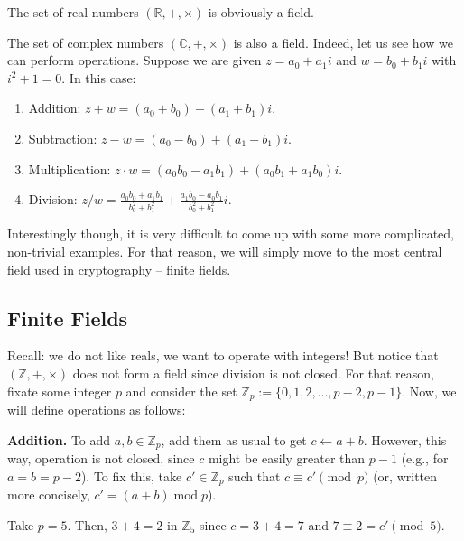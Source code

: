 \documentclass[../lecture-notes-148x210.tex]{subfiles}
\begin{document}
\begin{example}
    The set of real numbers $(\mathbb{R}, +, \times)$ is obviously a field.
\end{example}

\begin{example}
    The set of complex numbers $(\mathbb{C}, +, \times)$ is also a field. Indeed, let us see how we can perform operations. Suppose we are given $z = a_0 + a_1i$ and $w = b_0 + b_1i$ with $i^2+1=0$. In this case:
    \begin{enumerate}
        \item Addition: $z + w = (a_0 + b_0) + (a_1 + b_1)i$.
        \item Subtraction: $z - w = (a_0 - b_0) + (a_1 - b_1)i$.
        \item Multiplication: $z \cdot w = (a_0b_0 - a_1b_1) + (a_0b_1 + a_1b_0)i$.
        \item Division: $z / w = \frac{a_0b_0 + a_1b_1}{b_0^2 + b_1^2} + \frac{a_1b_0 - a_0b_1}{b_0^2 + b_1^2}i$.
    \end{enumerate}
\end{example}

Interestingly though, it is very difficult to come up with some more complicated, non-trivial examples. For that reason, we will simply move to the most central field used in cryptography -- finite fields.

\subsection{Finite Fields}
Recall: we do not like reals, we want to operate with integers! But notice that $(\mathbb{Z},+,\times)$ does not form a field since division is not closed. For that reason, fixate some integer $p$ and consider the set $\mathbb{Z}_p := \{0,1,2,\dots,p-2,p-1\}$. Now, we will define operations as follows:

\textbf{Addition.} To add $a,b \in \mathbb{Z}_p$, add them as usual to get $c \gets a+b$. However, this way, operation is not closed, since $c$ might be easily greater than $p-1$ (e.g., for $a=b=p-2$). To fix this, take $c' \in \mathbb{Z}_p$ such that $c \equiv c' \pmod{p}$ (or, written more concisely, $c' = (a+b) \;\text{mod} \; p$). 

\begin{example}
    Take $p=5$. Then, $3+4 = 2$ in $\mathbb{Z}_5$ since $c=3+4=7$ and $7 \equiv 2 = c' \pmod{5}$.
\end{example}
\end{document}
